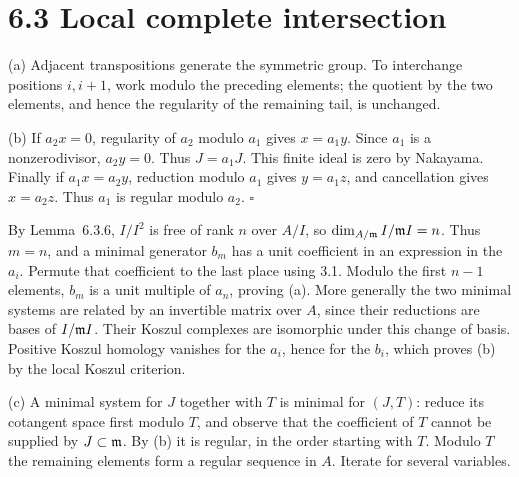 \documentclass[11pt]{article}
\let\chapterexercise\exercise
\renewcommand{\exercise}[2]{\Needspace{8\baselineskip}\chapterexercise{#1}{#2}}
\begin{document}
\section*{6.3 Local complete intersection}

\pf
(a) Adjacent transpositions generate the symmetric group. To interchange positions $i,i+1$, work modulo the preceding elements; the quotient by the two elements, and hence the regularity of the remaining tail, is unchanged.

(b) If $a_2x=0$, regularity of $a_2$ modulo $a_1$ gives $x=a_1y$. Since $a_1$ is a nonzerodivisor, $a_2y=0$. Thus $J=a_1J$. This finite ideal is zero by Nakayama. Finally if $a_1x=a_2y$, reduction modulo $a_1$ gives $y=a_1z$, and cancellation gives $x=a_2z$. Thus $a_1$ is regular modulo $a_2$. \hfill$\square$

\pf
By Lemma~6.3.6, $I/I^2$ is free of rank $n$ over $A/I$, so $\dim_{A/\mathfrak m}I/\mathfrak m I=n$. Thus $m=n$, and a minimal generator $b_m$ has a unit coefficient in an expression in the $a_i$. Permute that coefficient to the last place using 3.1. Modulo the first $n-1$ elements, $b_m$ is a unit multiple of $a_n$, proving (a). More generally the two minimal systems are related by an invertible matrix over $A$, since their reductions are bases of $I/\mathfrak m I$. Their Koszul complexes are isomorphic under this change of basis. Positive Koszul homology vanishes for the $a_i$, hence for the $b_i$, which proves (b) by the local Koszul criterion.

(c) A minimal system for $J$ together with $T$ is minimal for $(J,T)$: reduce its cotangent space first modulo $T$, and observe that the coefficient of $T$ cannot be supplied by $J\subset\mathfrak m$. By (b) it is regular, in the order starting with $T$. Modulo $T$ the remaining elements form a regular sequence in $A$. Iterate for several variables.
\end{document}
